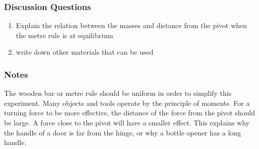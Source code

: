 \subsubsection*{Discussion Questions}
\begin{enumerate}
\item{Explain the relation between the masses and distance from the pivot when the metre rule is at equilibrium}
\item{write down other materials that can be used}
\end{enumerate}

\subsubsection*{Notes}
The wooden bar or metre rule should be uniform in order to simplify this experiment.
Many objects and tools operate by the principle of moments.  For a turning force to be more effective, the distance of the force from the pivot should be large.  A force close to the pivot will have a smaller effect.  This explains why the handle of a door is far from the hinge, or why a bottle opener has a long handle.

